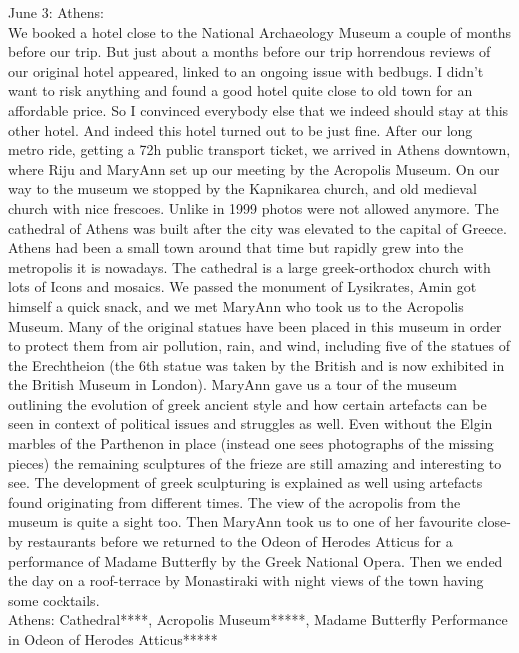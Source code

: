 June 3: Athens:\\
We booked a hotel close to the National Archaeology Museum a couple of months before our trip. But just about a months before our trip horrendous reviews of our original hotel appeared, linked to an ongoing issue with bedbugs. I didn't want to risk anything and found a good hotel quite close to old town for an affordable price. So I convinced everybody else that we indeed should stay at this other hotel. And indeed this hotel turned out to be just fine. After our long metro ride, getting a 72h public transport ticket, we arrived in Athens downtown, where Riju and MaryAnn set up our meeting by the Acropolis Museum. On our way to the museum we stopped by the Kapnikarea church, and old medieval church with nice frescoes. Unlike in 1999 photos were not allowed anymore. The cathedral of Athens was built after the city was elevated to the capital of Greece. Athens had been a small town around that time but rapidly grew into the metropolis it is nowadays. The cathedral is a large greek-orthodox church with lots of Icons and mosaics. We passed the monument of Lysikrates, Amin got himself a quick snack, and we met MaryAnn who took us to the Acropolis Museum. Many of the original statues have been placed in this museum in order to protect them from air pollution, rain, and wind, including five of the statues of the Erechtheion (the 6th statue was taken by the British and is now exhibited in the British Museum in London). MaryAnn gave us a tour of the museum outlining the evolution of greek ancient style and how certain artefacts can be seen in context of political issues and struggles as well. Even without the Elgin marbles of the Parthenon in place (instead one sees photographs of the missing pieces) the remaining sculptures of the frieze are still amazing and interesting to see. The development of greek sculpturing is explained as well using artefacts found originating from different times. The view of the acropolis from the museum is quite a sight too. Then MaryAnn took us to one of her favourite close-by restaurants before we returned to the Odeon of Herodes Atticus for a performance of Madame Butterfly by the Greek National Opera. Then we ended the day on a roof-terrace by Monastiraki with night views of the town having some cocktails.\\

Athens: Cathedral****, Acropolis Museum*****, Madame Butterfly Performance in Odeon of Herodes Atticus*****\\

